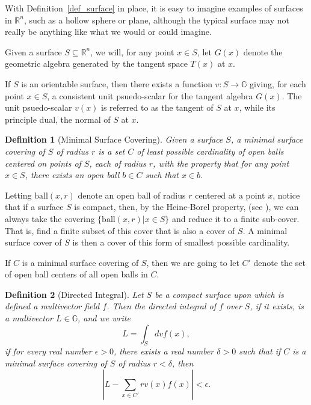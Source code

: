 \documentclass[12pt]{article}
\numberwithin{equation}{section}
\newcommand{\G}{\mathbb{G}}
\newcommand{\R}{\mathbb{R}}
\newtheorem{definition}{Definition}[section]
\begin{document}
With Definition~\ref{def_surface} in place, it is easy to imagine examples of surfaces in $\R^n$,
such as a hollow sphere or plane,
although the typical surface may not really be anything like what we would or could imagine.

Given a surface $S\subseteq\R^n$, we will, for any point $x\in S$, let $G(x)$ denote the geometric
algebra generated by the tangent space $T(x)$ at $x$.

If $S$ is an orientable surface, then there exists a function $v:S\to\G$ giving, for
each point $x\in S$, a consistent unit psuedo-scalar for the tangent algebra $G(x)$.
The unit psuedo-scalar $v(x)$ is referred to as the tangent of $S$ at $x$, while its
principle dual, the normal of $S$ at $x$.

\begin{definition}[Minimal Surface Covering]\label{def_surface_covering}
Given a surface $S$, a minimal surface covering of $S$ of radius $r$ is a set $C$ of least
possible cardinality of open
balls centered on points of $S$, each of radius $r$, with the property that for any point
$x\in S$, there exists an open ball $b\in C$ such that $x\in b$.
\end{definition}

Letting $\mbox{ball}(x,r)$ denote an open ball of radius $r$
centered at a point $x$, notice that if a surface $S$ is compact, then, by the Heine-Borel property,
(see \cite{}), we can always take the covering $\{\mbox{ball}(x,r)|x\in S\}$ and
reduce it to a finite sub-cover.  That is, find a finite subset of this cover that is
also a cover of $S$.  A minimal surface cover of $S$ is then a cover of this form
of smallest possible cardinality.

If $C$ is a minimal surface covering of $S$, then we are going to let $C'$ denote
the set of open ball centers of all open balls in $C$.

\begin{definition}[Directed Integral]\label{def_directed_integral}
Let $S$ be a compact surface upon which is defined a multivector field $f$.
Then the directed integral of $f$ over $S$, if it exists, is a multivector $L\in\G$, and we write
\begin{equation*}
L = \int_S dv f(x),
\end{equation*}
if for every real number $\epsilon>0$, there exists a real number $\delta>0$ such
that if $C$ is a minimal surface covering of $S$ of radius $r<\delta$, then
\begin{equation*}
\left|L - \sum_{x\in C'} r v(x)f(x)\right|<\epsilon.
\end{equation*}
\end{definition}
\end{document}

